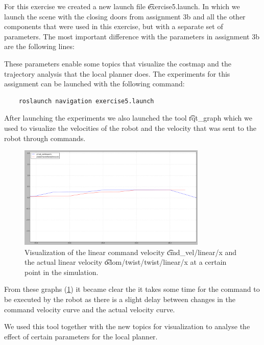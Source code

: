 
For this exercise we created a new launch file \t{exercise5.launch}. In which we launch the scene with the closing doors from assignment 3b and all the other components that were used in this exercise, but with a separate set of parameters. The most important difference with the parameters in assignment 3b are the following lines:



These parameters enable some topics that visualize the costmap and the trajectory analysis that the local planner does.
The experiments for this assignment can be launched with the following command:

\begin{lstlisting}
	roslaunch navigation exercise5.launch
\end{lstlisting}

After launching the experiments we also launched the tool \t{rqt_graph} which we used to visualize the velocities of the robot and the velocity that was sent to the robot through commands.

\begin{figure}
	\centering
	\includegraphics[width=0.80\textwidth]{./img/graph}
	\caption{Visualization of the linear command velocity \t{cmd_vel/linear/x} and the actual linear velocity \t{odom/twist/twist/linear/x} at a certain point in the simulation.}
	\label{fig:5:graph}
\end{figure}

From these graphs (\cref{fig:5:graph}) it became clear the it takes some time for the command to be executed by the robot as there is a slight delay between changes in the command velocity curve and the actual velocity curve.

We used this tool together with the new topics for visualization to analyse the effect of certain parameters for the local planner.

